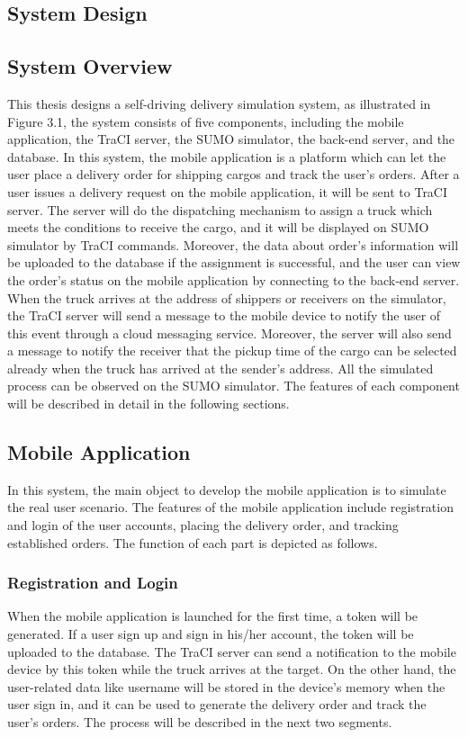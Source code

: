 \documentclass[12pt]{ksthesis}
\begin{document}
\begin{thesis}
{\chapter{System Design}\label{Chap:Architecture}

\section{System Overview}



This thesis designs a self-driving delivery simulation system, as illustrated in Figure 3.1, the system consists of five components, including the mobile application, the TraCI server, the SUMO simulator, the back-end server, and the database. In this system, the mobile application is a platform which can let the user place a delivery order for shipping cargos and track the user’s orders. After a user issues a delivery request on the mobile application, it will be sent to TraCI server. The server will do the dispatching mechanism to assign a truck which meets the conditions to receive the cargo, and it will be displayed on SUMO simulator by TraCI commands. Moreover, the data about order’s information will be uploaded to the database if the assignment is successful, and the user can view the order’s status on the mobile application by connecting to the back-end server. When the truck arrives at the address of shippers or receivers on the simulator, the TraCI server will send a message to the mobile device to notify the user of this event through a cloud messaging service. Moreover, the server will also send a message to notify the receiver that the pickup time of the cargo can be selected already when the truck has arrived at the sender’s address. All the simulated process can be observed on the SUMO simulator. The features of each component will be described in detail in the following sections.

\section{Mobile Application}
In this system, the main object to develop the mobile application is to simulate the real user scenario. The features of the mobile application include registration and login of the user accounts, placing the delivery order, and tracking established orders. The function of each part is depicted as follows.

\subsection{Registration and Login}
When the mobile application is launched for the first time, a token will be generated. If a user sign up and sign in his/her account, the token will be uploaded to the database. The TraCI server can send a notification to the mobile device by this token while the truck arrives at the target. On the other hand, the user-related data like username will be stored in the device’s memory when the user sign in, and it can be used to generate the delivery order and track the user’s orders. The process will be described in the next two segments.

}
\end{thesis}
\end{document}
